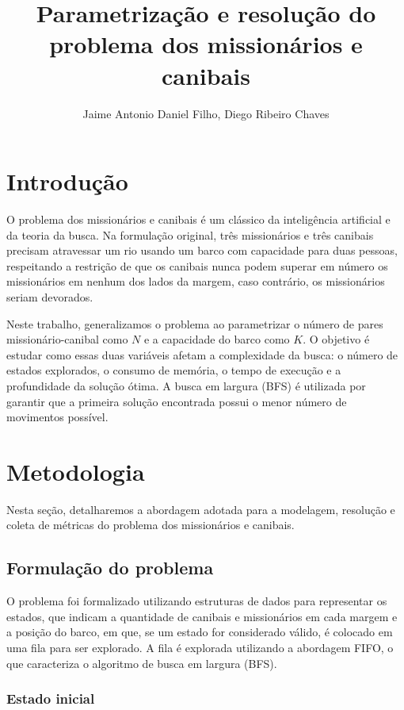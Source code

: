 \documentclass[12pt]{article}
\title{Parametrização e resolução do problema dos missionários e canibais}
\author{Jaime Antonio Daniel Filho\inst{1}, Diego Ribeiro Chaves\inst{1}}
\begin{document}
 

\maketitle

\section{Introdução}

O problema dos missionários e canibais é um clássico da inteligência artificial e da teoria da busca. Na formulação original, três missionários e três canibais precisam atravessar um rio usando um barco com capacidade para duas pessoas, respeitando a restrição de que os canibais nunca podem superar em número os missionários em nenhum dos lados da margem, caso contrário, os missionários seriam devorados.

Neste trabalho, generalizamos o problema ao parametrizar o número de pares missionário-canibal como $N$ e a capacidade do barco como $K$. O objetivo é estudar como essas duas variáveis afetam a complexidade da busca: o número de estados explorados, o consumo de memória, o tempo de execução e a profundidade da solução ótima. A busca em largura (BFS) é utilizada por garantir que a primeira solução encontrada possui o menor número de movimentos possível.

\section{Metodologia}

Nesta seção, detalharemos a abordagem adotada para a modelagem, resolução e coleta de métricas do problema dos missionários e canibais. 

\subsection{Formulação do problema}

O problema foi formalizado utilizando estruturas de dados para representar os estados, que indicam a quantidade de canibais e missionários em cada margem e a posição do barco, em que, se um estado for considerado válido, é colocado em uma fila para ser explorado. A fila é explorada utilizando a abordagem FIFO, o que caracteriza o algoritmo de busca em largura (BFS).

\subsubsection{Estado inicial}
\end{document}

